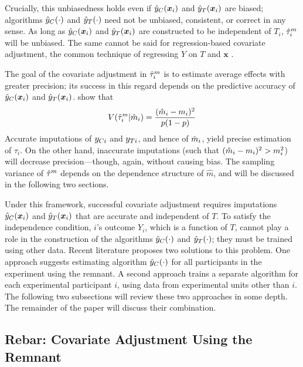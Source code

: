 Crucially, this unbiasedness holds even if $\hat{y}_C(\bm{x}_i)$ and $\hat{y}_T(\bm{x}_i)$ are biased; algorithms $\hat{y}_C(\cdot)$ and $\hat{y}_T(\cdot)$ need not be unbiased, consistent, or correct in any sense.
As long as $\hat{y}_C(\bm{x}_i)$ and $\hat{y}_T(\bm{x}_i)$ are constructed to be independent
of $T_i$, $\hat{\tau}_i^m$ will be unbiased.
The same cannot be said for regression-based covariate
adjustment, the common technique of regressing $Y$ on $T$ and $\bm{x}$
\citep{freedman2008regression}.

The goal of the covariate adjustment in $\hat{\tau}_i^m$ is to estimate average
effects with greater precision;
its success in this regard depends on the predictive accuracy of $\hat{y}_C(\bm{x}_i)$ and $\hat{y}_T(\bm{x}_i)$.
\citet{loop} show that
\begin{equation}
V(\hat{\tau}_i^m|\hat{m}_i)=\frac{(\hat{m}_i-m_i)^2}{p(1-p)}
\end{equation}
Accurate imputations of $y_{Ci}$ and $y_{Ti}$, and hence of $\hat{m}_i$, yield precise estimation of $\tau_i$.
On the other hand, inaccurate imputations (such that
$(\hat{m}_i-m_i)^2>m_i^2$) will decrease precision---though, again, without
causing bias.
The sampling variance of $\hat{\tau}^m$ depends on the dependence structure of
$\hat{m}$, and will be discussed in the following two sections.

Under this framework, successful covariate adjustment
requires imputations $\hat{y}_C(\bm{x}_i) $ and $\hat{y}_T(\bm{x}_i) $ that are accurate and
independent of $T$.
To satisfy the independence condition, $i$'s outcome $Y_i$, which is a
function of $T$, cannot play a role in the construction of the algorithms $\hat{y}_C(\cdot)$ and
$\hat{y}_T(\cdot)$; they must be trained using other data.
Recent literature proposes two solutions to this problem.
 One approach \citep{rebarEDM} suggests
estimating algorithm $\hat{y}_C(\cdot) $ for all participants in the
experiment using the remnant.
A second approach \citep{loop} trains a separate algorithm for each
experimental participant $i$, using data from experimental units other
than $i$.
The following two subsections will review these two approaches in some
depth.
The remainder of the paper will discuss their combination.

\subsection{Rebar: Covariate Adjustment Using the Remnant}\label{sec:intro.remant}

